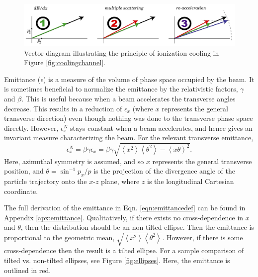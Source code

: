 \begin{figure}
  \centering
   \captionsetup{singlelinecheck=off}
    \includegraphics[width=\textwidth]{Figures/123ionization} 
  \caption{Vector diagram illustrating the principle of ionization cooling in Figure \ref{fig:coolingchannel}. }
  \label{fig:123ionization}
\end{figure}


\par
Emittance ($\epsilon$) is a measure of the volume of phase space occupied by the beam. It is sometimes beneficial to normalize the emittance by the relativistic factors, $\gamma$ and $\beta$. This is useful because when a beam accelerates the transverse angles decrease. This results in a  reduction of $\epsilon_x$ (where $x$ represents the general transverse direction) even though nothing was done to the transverse phase space directly. However, $\epsilon_x ^N$ stays constant when a beam accelerates, and hence gives an invariant measure characterizing the beam. For the relevant transverse emittance,
%
\begin{equation}
\label{eqn:emittancedef}
\epsilon_x^N=\beta\gamma\epsilon_x=\beta\gamma\sqrt{\left<x^2\right>\left<\theta^2\right>-\left<x\theta\right>^2}.
\end{equation}
%
Here, azimuthal symmetry is assumed, and so $x$ represents the general transverse position, and $\theta =\sin^{-1} p_x/p$ is the projection of the divergence angle of the particle trajectory onto the $x$-$z$ plane, where $z$ is the longitudinal Cartesian coordinate. 

The full derivation of the emittance in Eqn. \ref{eqn:emittancedef} can be found in Appendix \ref{apx:emittance}. Qualitatively, if there exists no cross-dependence in $x$ and $\theta$, then the distribution should be an non-tilted ellipse. Then the emittance is proportional to the geometric mean, $\sqrt{\left<x^2\right>\left<\theta^2\right>}$. However, if there is some cross-dependence then the result is a tilted ellipse. For a sample comparison of tilted vs. non-tilted ellipses, see Figure \ref{fig:ellipses}. Here, the emittance is outlined in red.

